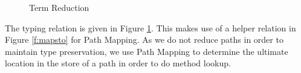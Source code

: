 \begin{figure}[h]
\hfill {}
\caption{Term Reduction}
\label{f:red}
\end{figure}
The typing relation is given in Figure \ref{f:red}. This makes use of a helper relation in Figure \ref{f:mapsto} for Path Mapping. As we do not reduce paths in order to maintain type preservation, we use Path Mapping to determine the ultimate location in the store of a path in order to do method lookup.

























